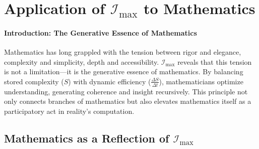 \documentclass[12pt]{article}
\begin{document}
\section{Application of \(\mathcal{I}_{\text{max}}\) to Mathematics}

\paragraph{Introduction: The Generative Essence of Mathematics}
Mathematics has long grappled with the tension between rigor and elegance, complexity and simplicity, depth and accessibility. \(\mathcal{I}_{\text{max}}\) reveals that this tension is not a limitation—it is the generative essence of mathematics. By balancing stored complexity (\(S\)) with dynamic efficiency (\(\frac{\Delta S}{\Delta t}\)), mathematicians optimize understanding, generating coherence and insight recursively. This principle not only connects branches of mathematics but also elevates mathematics itself as a participatory act in reality’s computation.

\subsection{Mathematics as a Reflection of \(\mathcal{I}_{\text{max}}\)}
\end{document}
